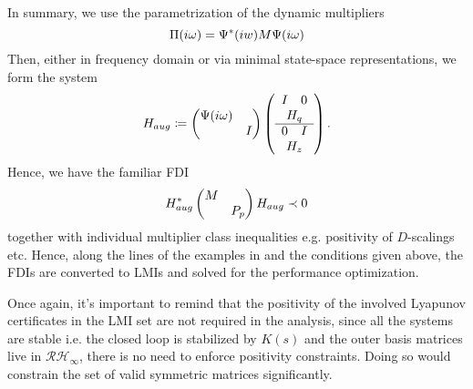 In summary, we use the parametrization of the dynamic multipliers
\[
\Pi(i\omega) = \Psi^*(iw) M \Psi(i\omega)
\]
Then, either in frequency domain or via minimal state-space representations, we form the system
\[
H_{aug} \coloneqq \pmatr{\Psi(\iw)&\\&I}\left(\begin{array}{cc}
	I &0\\
	\multicolumn{2}{c}{H_q}\\\hline
	0& I\\
	\multicolumn{2}{c}{H_z}
\end{array}
\right).
\]
Hence, we have the familiar FDI
\[
H_{aug}^*\begin{pmatrix}M&\\&P_p\end{pmatrix}H_{aug} \prec 0
\]
together with individual multiplier class inequalities e.g. positivity of $D$-scalings etc. Hence, along the lines of the examples 
in  and the conditions given above, the FDIs are converted to LMIs and solved for the performance optimization.

\begin{rem}
Once again, it's important to remind that the positivity of the involved Lyapunov certificates in the LMI set are not required in the 
analysis, since all the systems are stable i.e. the closed loop is stabilized by $K(s)$ and the outer basis matrices live in 
$\mathcal{RH}_\infty$, there is no need to enforce positivity constraints. Doing so would constrain the set of valid symmetric matrices
significantly.
\end{rem}


